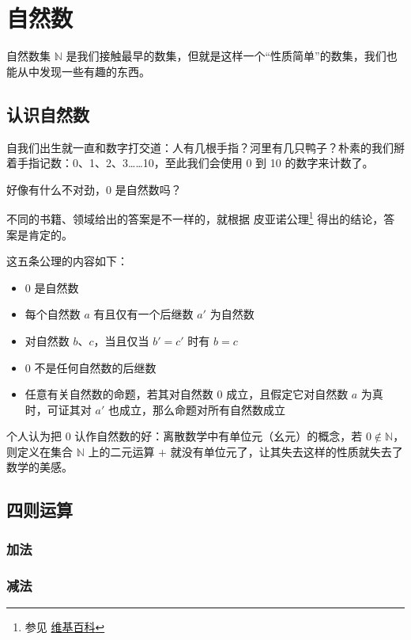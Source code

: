 \chapter{自然数}

自然数集 $\mathbb{N}$ 是我们接触最早的数集，但就是这样一个“性质简单”的数集，我们也能从中发现一些有趣的东西。

\section{认识自然数}

自我们出生就一直和数字打交道：人有几根手指？河里有几只鸭子？朴素的我们掰着手指记数：0、1、2、3……10，至此我们会使用 0 到 10 的数字来计数了。

好像有什么不对劲，0 是自然数吗？

不同的书籍、领域给出的答案是不一样的，就根据 皮亚诺公理\footnote{参见 \href{https://zh.wikipedia.org/wiki/\%E7\%9A\%AE\%E4\%BA\%9A\%E8\%AF\%BA\%E5\%85\%AC\%E7\%90\%86}{维基百科}} 得出的结论，答案是肯定的。

这五条公理的内容如下：

\begin{itemize}
  \item $0$ 是自然数
  \item 每个自然数 $a$ 有且仅有一个后继数 $a'$ 为自然数
  \item 对自然数 $b$、$c$，当且仅当 $b' = c'$ 时有 $b = c$
  \item $0$ 不是任何自然数的后继数
  \item 任意有关自然数的命题，若其对自然数 $0$ 成立，且假定它对自然数 $a$ 为真时，可证其对 $a'$ 也成立，那么命题对所有自然数成立
\end{itemize}

个人认为把 0 认作自然数的好：离散数学中有单位元（幺元）的概念，若 $0 \notin \mathbb{N}$，则定义在集合 $\mathbb{N}$ 上的二元运算 $+$ 就没有单位元了，让其失去这样的性质就失去了数学的美感。

\section{四则运算}

\subsection{加法}

\subsection{减法}

